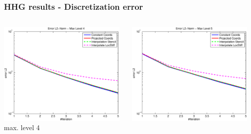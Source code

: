 \documentclass[t,compress=false,usepdftitle=false]{beamer}
\begin{document}
%
%
\begin{frame}\frametitle{HHG results - Discretization error}

\begin{columns}[T] 
\begin{column}[T]{4.3cm} 
  \centering
  \includegraphics[width=0.98\textwidth]{spherestokes_errorEuc_level4}\\
  max. level 4
\end{column}\hfill
\begin{column}[T]{4.3cm} 
  \centering
  \includegraphics[width=0.98\textwidth]{spherestokes_errorEuc_level5}\\

\end{column}
\end{columns}
\end{frame}
\end{document}
